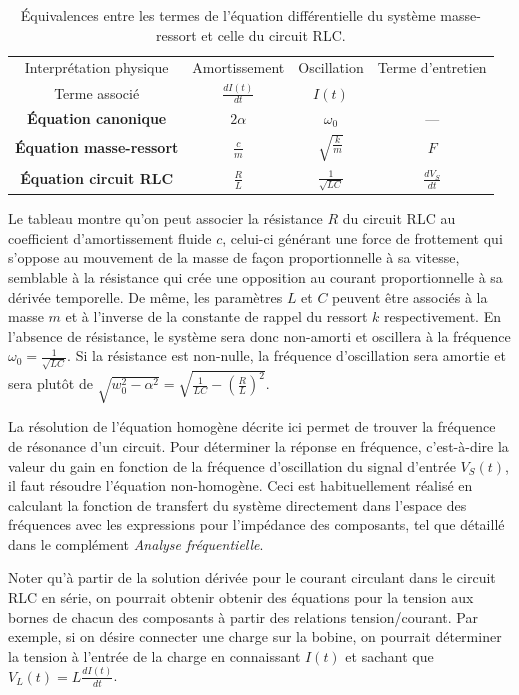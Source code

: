 \documentclass[canadien,12pt,oneside,letterpaper]{article}
\begin{document}
\begin{table}[h]
\centering
\begin{tabular}{c|ccc}
\hline
Interprétation physique & Amortissement & Oscillation & Terme d'entretien \\
Terme associé & $\frac{dI(t)}{dt}$ & $I(t)$ & \\
\hline
\textbf{Équation canonique} & $2\alpha$ & $\omega_0$ & ---\\
\textbf{Équation masse-ressort} & $\frac{c}{m}$ & $\sqrt{\frac{k}{m}}$ & $F$ \\
\textbf{Équation circuit RLC} & $\frac{R}{L}$ & $\frac{1}{\sqrt{LC}}$ & $\frac{dV_S}{dt}$ \\
\hline
\end{tabular}
\caption{\label{table-equiv_masse_ressort}Équivalences entre les termes de l'équation différentielle du système masse-ressort et celle du circuit RLC.}
\end{table}
Le tableau montre qu'on peut associer la résistance $R$ du circuit RLC au coefficient d'amortissement fluide $c$, celui-ci générant une force de frottement qui s'oppose au mouvement de la masse de façon proportionnelle à sa vitesse, semblable à la résistance qui crée une opposition au courant proportionnelle à sa dérivée temporelle. De même, les paramètres $L$ et $C$ peuvent être associés à la masse $m$ et à l'inverse de la constante de rappel du ressort $k$ respectivement. En l'absence de résistance, le système sera donc non-amorti et oscillera à la fréquence $\omega_0=\frac{1}{\sqrt{LC}}$. Si la résistance est non-nulle, la fréquence d'oscillation sera amortie et sera plutôt de $\sqrt{w_0^2-\alpha^2}=\sqrt{\frac{1}{LC}-\left(\frac{R}{L}\right)^2}$.  

La résolution de l'équation homogène décrite ici permet de trouver la fréquence de résonance d'un circuit. Pour déterminer la réponse en fréquence, c'est-à-dire la valeur du gain en fonction de la fréquence d'oscillation du signal d'entrée $V_S(t)$, il faut résoudre l'équation non-homogène. Ceci est habituellement réalisé en calculant la fonction de transfert du système directement dans l'espace des fréquences avec les expressions pour l'impédance des composants, tel que détaillé dans le complément \textit{Analyse fréquentielle}.

Noter qu'à partir de la solution dérivée pour le courant circulant dans le circuit RLC en série, on pourrait obtenir obtenir des équations pour la tension aux bornes de chacun des composants à partir des relations tension/courant. Par exemple, si on désire connecter une charge sur la bobine, on pourrait déterminer la tension à l'entrée de la charge en connaissant $I(t)$ et sachant que $V_L(t) = L\frac{dI(t)}{dt}$.
\end{document}
